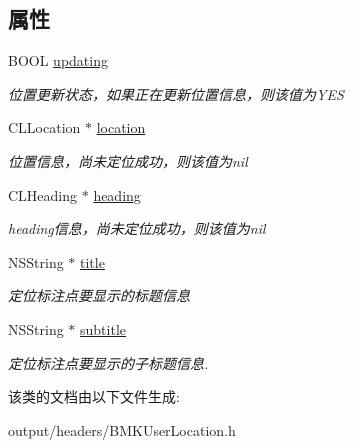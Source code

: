 \subsection*{属性}
\begin{DoxyCompactItemize}
\item 
\hypertarget{interface_b_m_k_user_location_a57e486ccb3b7665183e9e1eaa4d2716e}{}B\+O\+O\+L \hyperlink{interface_b_m_k_user_location_a57e486ccb3b7665183e9e1eaa4d2716e}{updating}\label{interface_b_m_k_user_location_a57e486ccb3b7665183e9e1eaa4d2716e}

\begin{DoxyCompactList}\small\item\em 位置更新状态，如果正在更新位置信息，则该值为\+Y\+E\+S \end{DoxyCompactList}\item 
\hypertarget{interface_b_m_k_user_location_aba4b76e55f4605c5554fe16aca1b4fbf}{}C\+L\+Location $\ast$ \hyperlink{interface_b_m_k_user_location_aba4b76e55f4605c5554fe16aca1b4fbf}{location}\label{interface_b_m_k_user_location_aba4b76e55f4605c5554fe16aca1b4fbf}

\begin{DoxyCompactList}\small\item\em 位置信息，尚未定位成功，则该值为nil \end{DoxyCompactList}\item 
\hypertarget{interface_b_m_k_user_location_a23e9a1be042844a326e4bbc589ec613c}{}C\+L\+Heading $\ast$ \hyperlink{interface_b_m_k_user_location_a23e9a1be042844a326e4bbc589ec613c}{heading}\label{interface_b_m_k_user_location_a23e9a1be042844a326e4bbc589ec613c}

\begin{DoxyCompactList}\small\item\em heading信息，尚未定位成功，则该值为nil \end{DoxyCompactList}\item 
\hypertarget{interface_b_m_k_user_location_a8fc42845ec226a1af2de73c8dd4d183d}{}N\+S\+String $\ast$ \hyperlink{interface_b_m_k_user_location_a8fc42845ec226a1af2de73c8dd4d183d}{title}\label{interface_b_m_k_user_location_a8fc42845ec226a1af2de73c8dd4d183d}

\begin{DoxyCompactList}\small\item\em 定位标注点要显示的标题信息 \end{DoxyCompactList}\item 
\hypertarget{interface_b_m_k_user_location_af38d7aa4f89637da255ca7308fcaa240}{}N\+S\+String $\ast$ \hyperlink{interface_b_m_k_user_location_af38d7aa4f89637da255ca7308fcaa240}{subtitle}\label{interface_b_m_k_user_location_af38d7aa4f89637da255ca7308fcaa240}

\begin{DoxyCompactList}\small\item\em 定位标注点要显示的子标题信息. \end{DoxyCompactList}\end{DoxyCompactItemize}


该类的文档由以下文件生成\+:\begin{DoxyCompactItemize}
\item 
output/headers/B\+M\+K\+User\+Location.\+h\end{DoxyCompactItemize}
